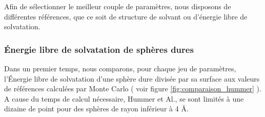 Afin de sélectionner le meilleur couple de paramètres, nous disposons de différentes références, que ce soit de structure de solvant ou d'énergie libre de solvatation. 


\subsubsection{\'Energie libre de solvatation de sphères dures}
Dans un premier temps, nous comparons, pour chaque jeu de paramètres, l'\'Energie libre de solvatation d'une sphère dure divisée par sa surface aux valeurs de références calculées par Monte Carlo\cite{hummer_information_1996} ( voir figure \ref{fig:comparaison_hummer} ). A cause du temps de calcul nécessaire, Hummer et Al., se sont limités à une dizaine de point pour des sphères de rayon inférieur à 4 \AA.




